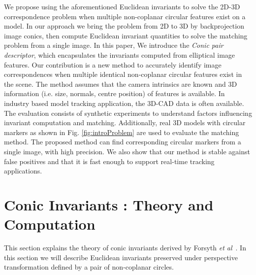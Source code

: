 \documentclass{bmvc2k}
\def\etal{\emph{et al}\bmvaOneDot}
\begin{document}
\par 
We propose using the aforementioned Euclidean invariants to solve the 2D-3D correspondence problem when multiple non-coplanar circular features exist on a model.
In our approach we bring the problem from 2D to 3D by backprojection image conics, then compute Euclidean invariant quantities to solve the matching problem from a single image.
In this paper, We introduce the \textit{Conic pair descriptor}, which encapsulates the invariants computed from elliptical image features.
Our contribution is a new method to accurately identify image correspondences when multiple identical non-coplanar circular features exist in the scene. 
The method assumes that the camera intrinsics are known and 3D information (i.e. size, normals, centre position) of features is available. 
In industry based model tracking application, the 3D-CAD data is often available. 
The evaluation consists of synthetic experiments to understand factors influencing invariant computation and matching. 
Additionally, real 3D models with circular markers as shown in Fig. \ref{fig:introProblem} are used to evaluate the matching method.
The proposed method can find corresponding circular markers from a single image, with high precision.
We also show that our method is stable against false positives and that it is fast enough to support real-time tracking applications. 

\section{Conic Invariants : Theory and Computation}
\label{Sec:ConicInv}
This section explains the theory of conic invariants derived by Forsyth \etal~\cite{forsyth_91}.
In this section we will describe Euclidean invariants preserved under perspective transformation defined by a pair of non-coplanar circles.
\end{document}
